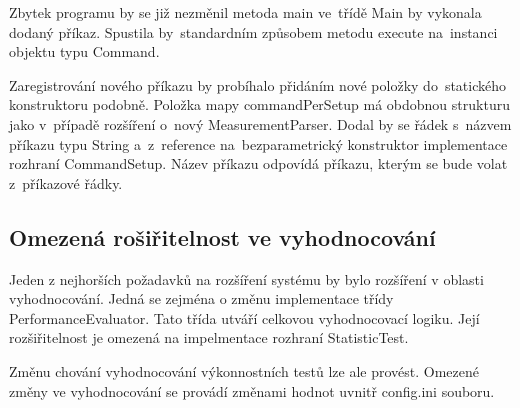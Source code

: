Zbytek programu by se již nezměnil metoda main ve~třídě Main by vykonala dodaný příkaz. Spustila by~standardním způsobem
metodu execute na~instanci objektu typu Command.

Zaregistrování nového příkazu by probíhalo přidáním nové položky do~statického konstruktoru podobně.
Položka mapy commandPerSetup má obdobnou strukturu jako v~případě rozšíření o~nový MeasurementParser.
Dodal by se řádek s~názvem příkazu typu String a~z~reference na~bezparametrický konstruktor
implementace rozhraní CommandSetup. Název příkazu odpovídá příkazu, kterým se bude volat z~příkazové řádky.

\subsection{Omezená rošiřitelnost ve vyhodnocování}

Jeden z nejhorších požadavků na rozšíření systému by bylo rozšíření v oblasti vyhodnocování.
Jedná se zejména o změnu implementace třídy PerformanceEvaluator. Tato třída utváří
celkovou vyhodnocovací logiku. Její rozšiřitelnost je omezená na impelmentace rozhraní
StatisticTest.

Změnu chování vyhodnocování výkonnostních testů lze ale provést. Omezené změny ve vyhodnocování
se provádí změnami hodnot uvnitř config.ini souboru.